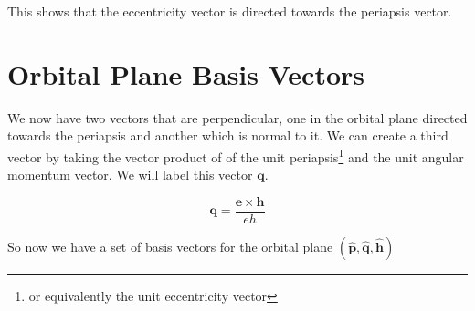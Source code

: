 This shows that the eccentricity vector is directed towards the periapsis vector.

\section{Orbital Plane Basis Vectors}
We now have two vectors that are perpendicular, one in the orbital plane directed towards the periapsis and
another which is normal to it. We can create a third vector by taking the vector product of of the unit
periapsis\footnote{or equivalently the unit eccentricity vector} and the unit angular momentum vector. We
will label this vector $\mathbf{q}$.

\begin{equation}
\mathbf{q}=\frac{\mathbf{e}\times\mathbf{h}}{e h}
\end{equation}

So now we have a set of basis vectors for the orbital plane $(\hat{\mathbf{p}},\hat{\mathbf{q}},\hat{\mathbf{h}})$
